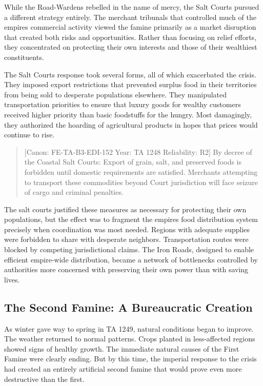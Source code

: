 While the Road-Wardens rebelled in the name of mercy, the Salt Courts
pursued a different strategy entirely. The merchant tribunals that
controlled much of the empire\textquotesingle s commercial activity
viewed the famine primarily as a market disruption that created both
risks and opportunities. Rather than focusing on relief efforts, they
concentrated on protecting their own interests and those of their
wealthiest constituents.

The Salt Courts\textquotesingle{} response took several forms, all of
which exacerbated the crisis. They imposed export restrictions that
prevented surplus food in their territories from being sold to desperate
populations elsewhere. They manipulated transportation priorities to
ensure that luxury goods for wealthy customers received higher priority
than basic foodstuffs for the hungry. Most damagingly, they authorized
the hoarding of agricultural products in hopes that prices would
continue to rise.

\begin{quote}
{[}Canon: FE-TA-B3-EDI-152 \textbar{} Year: TA 1248 \textbar{}
Reliability: R2{]} By decree of the Coastal Salt Courts: Export of
grain, salt, and preserved foods is forbidden until domestic
requirements are satisfied. Merchants attempting to transport these
commodities beyond Court jurisdiction will face seizure of cargo and
criminal penalties.
\end{quote}

The salt courts justified these measures as necessary for protecting
their own populations, but the effect was to fragment the
empire\textquotesingle s food distribution system precisely when
coordination was most needed. Regions with adequate supplies were
forbidden to share with desperate neighbors. Transportation routes were
blocked by competing jurisdictional claims. The Iron Roads, designed to
enable efficient empire-wide distribution, became a network of
bottlenecks controlled by authorities more concerned with preserving
their own power than with saving lives.

\subsection{The Second Famine: A Bureaucratic
Creation}\label{the-second-famine-a-bureaucratic-creation}

As winter gave way to spring in TA 1249, natural conditions began to
improve. The weather returned to normal patterns. Crops planted in
less-affected regions showed signs of healthy growth. The immediate
natural causes of the First Famine were clearly ending. But by this
time, the imperial response to the crisis had created an entirely
artificial second famine that would prove even more destructive than the
first.

